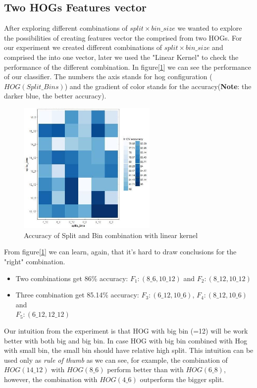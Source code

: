 \subsection{Two HOGs Features vector}
After exploring different combinations of $split\times bin\_size$ we wanted to explore the possibilities of creating features vector the comprised from two HOGs. For our experiment we created different combinations of $split\times bin\_size$ and comprised the into one vector, later we used the "Linear Kernel" to check the performance of the different combination. In figure[\ref{fig:exp1a}] we can see the performance of our classifier. The numbers the axis stands for hog configuration ($HOG(Split\_Bins)$) and the gradient of color stands for the accuracy(\textbf{Note}: the darker blue, the better accuracy). 
\begin{figure}[!h]
    \centering
    \includegraphics[width=0.6\textwidth]{Images/Accuracy_for_categories_1a.jpeg}
    \caption{Accuracy of Split and Bin combination with linear kernel}
    \label{fig:exp1a}
\end{figure}

From figure[\ref{fig:exp1a}] we can learn, again, that it's hard to draw conclusions for the "right" combination.
\begin{itemize}
    \item Two combinations get 86\% accuracy: $F_1: (8\_6, 10\_12)$ and $F_2: (8\_12,10\_12)$
    \item Three combination get 85.14\% accuracy: $F_3:(6\_12, 10\_6)$, $F_4:(8\_12, 10\_6)$ and \\ $F_5:(6\_12, 12\_12)$
\end{itemize}

Our intuition from the experiment is that HOG with big bin (=12) will be work better with both big and big bin. In case HOG with big bin combined with Hog with small bin, the small bin should have relative high split. This intuition can be used only as \textit{rule of thumb} as we can see, for example, the combination of $HOG(14\_12)$ with $HOG(8\_6)$ perform better than with $HOG(6\_8)$, however, the combination with $HOG(4\_6)$ outperform the bigger split.

